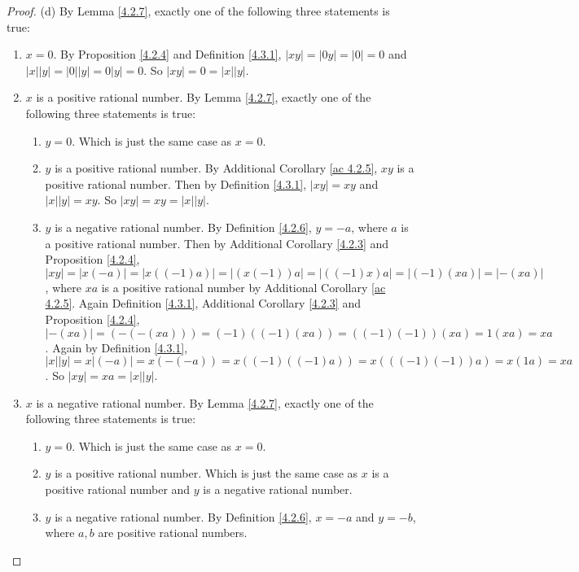\begin{proof}{(d)}
By Lemma \ref{4.2.7}, exactly one of the following three statements is true:
\begin{enumerate}[label=(\Roman*)]
    \item \(x = 0\).
    By Proposition \ref{4.2.4} and Definition \ref{4.3.1}, \(|xy| = |0y| = |0| = 0\) and \(|x||y| = |0||y| = 0|y| = 0\).
    So \(|xy| = 0 = |x||y|\).
    \item \(x\) is a positive rational number.
    By Lemma \ref{4.2.7}, exactly one of the following three statements is true:
    \begin{enumerate}[label=(\roman*)]
        \item \(y = 0\).
        Which is just the same case as \(x = 0\).
        \item \(y\) is a positive rational number.
        By Additional Corollary \ref{ac 4.2.5}, \(xy\) is a positive rational number.
        Then by Definition \ref{4.3.1}, \(|xy| = xy\) and \(|x||y| = xy\).
        So \(|xy| = xy = |x||y|\).
        \item \(y\) is a negative rational number.
        By Definition \ref{4.2.6}, \(y = -a\), where \(a\) is a positive rational number.
        Then by Additional Corollary \ref{4.2.3} and Proposition \ref{4.2.4}, \(|xy| = |x(-a)| = |x((-1)a)| = |(x(-1))a| = |((-1)x)a| = |(-1)(xa)| = |-(xa)|\), where \(xa\) is a positive rational number by Additional Corollary \ref{ac 4.2.5}.
        Again Definition \ref{4.3.1}, Additional Corollary \ref{4.2.3} and Proposition \ref{4.2.4}, \(|-(xa)| = (-(-(xa))) = (-1)((-1)(xa)) = ((-1)(-1))(xa) = 1(xa) = xa\).
        Again by Definition \ref{4.3.1}, \(|x||y| = x|(-a)| = x(-(-a)) = x((-1)((-1)a)) = x(((-1)(-1))a) = x(1a) = xa\).
        So \(|xy| = xa = |x||y|\).
    \end{enumerate}
    \item \(x\) is a negative rational number.
    By Lemma \ref{4.2.7}, exactly one of the following three statements is true:
    \begin{enumerate}[label=(\roman*)]
        \item \(y = 0\).
        Which is just the same case as \(x = 0\).
        \item \(y\) is a positive rational number.
        Which is just the same case as \(x\) is a positive rational number and \(y\) is a negative rational number.
        \item \(y\) is a negative rational number.
        By Definition \ref{4.2.6}, \(x = -a\) and \(y = -b\), where \(a, b\) are positive rational numbers.

\end{enumerate}
\end{enumerate}
\end{proof}
